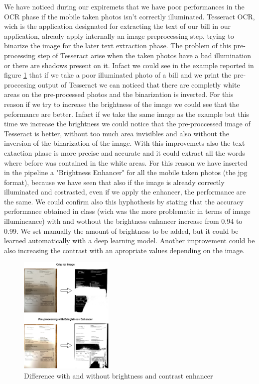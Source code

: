 \documentclass[10pt,twocolumn,letterpaper]{article}
\begin{document}
We have noticed during our expiremets that we have poor performances
in the OCR phase if the mobile taken photos isn't correctly
illuminated. Tesseract OCR, wich is the application designated for
extracting the text of our bill in our application, already apply
internally an image preprocessing step, trying to binarize the image
for the later text extraction phase. The problem of this
pre-processing step of Tesseract arise when the taken photos have a
bad illumination or there are shadows present on it. Infact we could
see in the example reported in figure
\ref{bright-constrast-experiment} that if we take a poor illuminated
photo of a bill and we print the pre-proccesing output of Tesseract we
can noticed that there are completly white areas on the pre-processed
photos and the binarization is inverted. For this reason if we try to
increase the brightness of the image we could see that the peformance
are better. Infact if we take the same image as the example but this
time we increase the brightness we could notice that the
pre-proccessed image of Tesseract is better, without too much area
invisibles and also without the inversion of the binarization of the
image. With this improvemets also the text extaction phase is more
precise and accurate and it could extract all the words where before
was contained in the white areas. For this reason we have inserted in
the pipeline a "Brightness Enhancer" for all the mobile taken photos
(the jpg format), because we have seen that also if the image is
already correctly illuminated and costrasted, even if we apply the
enhancer, the performance are the same. We could confirm also this
hyphothesis by stating that the accuracy performance obtained in class
(wich was the more problematic in terms of image illumincance) with
and wothout the brightness enhancer increase from 0.94 to 0.99. We set
manually the amount of brightness to be added, but it could be learned
automatically with a deep learning model. Another improvement could be
also increasing the contrast with an apropriate values depending on
the image.

\begin{figure}[h]
  \centering
  \includegraphics[width=0.4\textwidth]{images/bright-contrast-experiment.png}
  \caption{Difference with and without brightness and contrast enhancer}
  \label{bright-constrast-experiment}
\end{figure}
\end{document}
